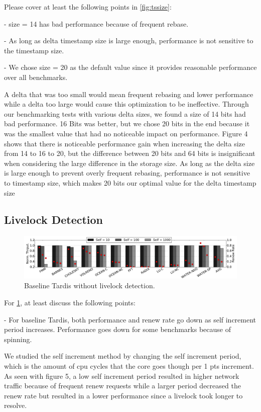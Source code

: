 \documentclass[12pt]{article}
\begin{document}
Please cover at least the following points in \cref{fig:tssize}:

- size = 14 has bad performance because of frequent rebase.

- As long as delta timestamp size is large enough, performance is not 
  sensitive to the timestamp size.

- We chose size = 20 as the default value since it provides reasonable 
  performance over all benchmarks.


A delta that was too small would mean frequent rebasing and lower performance while a delta too large would cause this optimization to be ineffective. Through our benchmarking tests with various delta sizes, we found a size of 14 bits had bad performance. 16 Bits was better, but we chose 20 bits in the end because it was the smallest value that had no noticeable impact on performance. Figure 4 shows that  there is noticeable performance gain when increasing the delta size from 14 to 16 to 20, but the difference between 20 bits and 64 bits is insignificant when considering the large difference in the storage size. As long as the delta size is large enough to prevent overly frequent rebasing, performance is not sensitive to timestamp size, which makes 20 bits our optimal value for the delta timestamp size
\subsection{Livelock Detection}

\begin{figure}
	\centering
	\includegraphics[width=0.95\columnwidth]{figs/selfincr_nolive.pdf}
	\caption{ Baseline Tardis without livelock detection. }
	\label{fig:self-nolive}
\end{figure}

For \cref{fig:self-nolive}, at least discuss the following points:

- For baseline Tardis, both performance and renew rate go down as self
  increment period increases. Performance goes down for some
  benchmarks because of spinning.
  
  We studied the self increment method by changing the self increment period, which is the amount of cpu cycles that the core goes though per 1 pts increment. As seen with figure 5, a low self increment period resulted in higher network traffic because of frequent renew requests while a larger period decreased the renew rate but resulted in a lower performance since a livelock took longer to resolve.  
  
\end{document}
